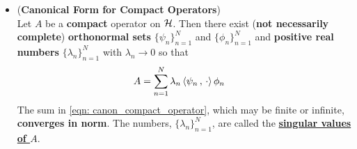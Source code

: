 \documentclass[11pt]{article}
\begin{document}
\begin{itemize}
\item \begin{theorem}(\textbf{Canonical Form for Compact Operators})   \citep{reed1980methods}\\
Let $A$ be a \textbf{compact} operator on ${\mathcal H}$. Then there exist (\textbf{not necessarily complete}) \textbf{orthonormal sets} $\{\psi_n\}_{n=1}^{N}$ and $\{\phi_n\}_{n=1}^{N}$ and \textbf{positive real numbers} $\{\lambda_n\}_{n=1}^{N}$ with $\lambda_n \rightarrow 0$ so that 
\begin{align}
A &= \sum_{n=1}^{N}\lambda_n\left\langle \psi_n\,,\, \cdot \right\rangle\phi_n \label{eqn: canon_compact_operator}
\end{align}
The sum in \eqref{eqn: canon_compact_operator}, which may be finite or infinite, \textbf{converges in norm}. The numbers, $\{\lambda_n\}_{n=1}^{N}$, are called the \underline{\textbf{singular values of $A$}}. 
\end{theorem}
\end{itemize}
\end{document}
